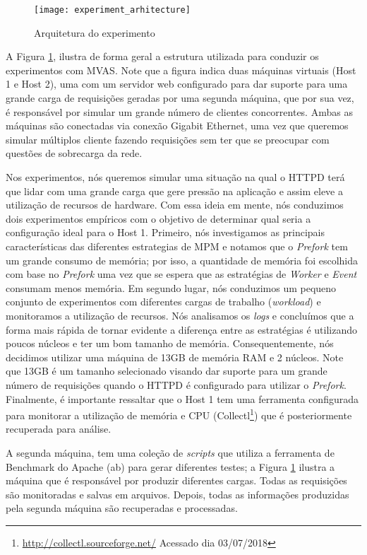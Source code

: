 \begin{figure}[!h] \centering
  \texttt{[image: experiment\_arhitecture]}
  \caption{Arquitetura do experimento} \label{fig:experiment_architecture}
\end{figure}

A Figura  \ref{fig:experiment_architecture}, ilustra de forma geral a estrutura
utilizada para conduzir os experimentos com MVAS. Note que a figura indica duas
máquinas virtuais (Host 1 e Host 2), uma com um servidor web configurado para
dar suporte para uma grande carga de requisições geradas por uma segunda
máquina, que por sua vez, é responsável por simular um grande número de
clientes concorrentes. Ambas as máquinas são conectadas via conexão Gigabit
Ethernet, uma vez que queremos simular múltiplos cliente fazendo requisições
sem ter que se preocupar com questões de sobrecarga da rede.

Nos experimentos, nós queremos simular uma situação na qual o HTTPD terá que
lidar com uma grande carga que gere pressão na aplicação e assim eleve a
utilização de recursos de hardware. Com essa ideia em mente, nós conduzimos
dois experimentos empíricos com o objetivo de determinar qual seria a
configuração ideal para o Host 1. Primeiro, nós investigamos as principais
características das diferentes estrategias de MPM e notamos que o
\emph{Prefork} tem um grande consumo de memória; por isso, a quantidade de
memória foi escolhida com base no \emph{Prefork} uma vez que se espera que as
estratégias de \emph{Worker} e \emph{Event} consumam menos memória. Em segundo
lugar, nós conduzimos um pequeno conjunto de experimentos com diferentes cargas
de trabalho (\emph{workload}) e monitoramos a utilização de recursos. Nós
analisamos os \emph{logs} e concluímos que a forma mais rápida de tornar evidente a
diferença entre as estratégias é utilizando poucos núcleos e ter um bom
tamanho de memória. Consequentemente, nós decidimos utilizar uma máquina de
13GB de memória RAM e 2 núcleos. Note que 13GB é um tamanho selecionado visando
dar suporte para um grande número de requisições quando o HTTPD é configurado
para utilizar o \emph{Prefork}. Finalmente, é importante ressaltar que o Host 1
tem uma ferramenta configurada para monitorar a utilização de memória e CPU
(Collectl\footnote{\url{http://collectl.sourceforge.net/} Acessado dia 03/07/2018})
que é posteriormente recuperada para análise.

A segunda máquina, tem uma coleção de \emph{scripts} que utiliza a ferramenta de
Benchmark do Apache (ab) para gerar diferentes testes; a Figura
\ref{fig:experiment_architecture} ilustra a máquina que é responsável por
produzir diferentes cargas. Todas as requisições são monitoradas e salvas em
arquivos. Depois, todas as informações produzidas pela segunda máquina são
recuperadas e processadas.

